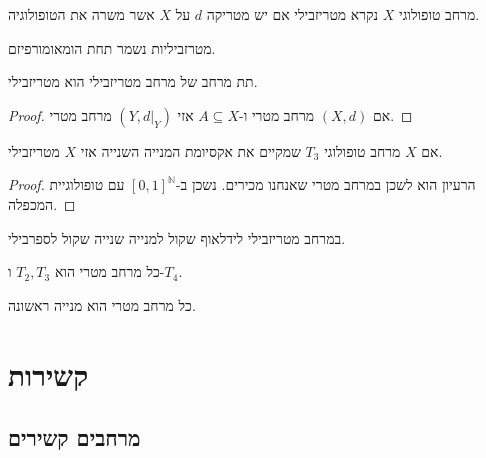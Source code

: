 \documentclass{tstextbook}
\begin{document}
\begin{definition}
מרחב טופולוגי \(X\) נקרא מטריזבילי אם יש מטריקה \(d\) על \(X\) אשר משרה את הטופולוגיה.

\end{definition}
\begin{proposition}
מטרזביליות נשמר תחת הומאומורפיזם.

\end{proposition}
\begin{proposition}
תת מרחב של מרחב מטריזבילי הוא מטריזבילי.

\end{proposition}
\begin{proof}
אם \((X,d)\) מרחב מטרי ו-\(A\subseteq X\) אזי \((Y,d|_{Y})\) מרחב מטרי.

\end{proof}
\begin{theorem}
אם \(X\) מרחב טופולוגי \(T_{3}\) שמקיים את אקסיומת המנייה השנייה אזי \(X\) מטריזבילי.

\end{theorem}
\begin{proof}
הרעיון הוא לשכן במרחב מטרי שאנחנו מכירים. נשכן ב-\([0,1]^{\mathbb{N}}\) עם טופולוגיית המכפלה.

\end{proof}
\begin{proposition}
במרחב מטריזבילי לידלאוף שקול למנייה שנייה שקול לספרבילי.

\end{proposition}
\begin{proposition}
כל מרחב מטרי הוא \(T_{2},T_{3}\) ו-\(T_{4}\).

\end{proposition}
\begin{proposition}
כל מרחב מטרי הוא מנייה ראשונה.

\end{proposition}
\chapter{קשירות}

\section{מרחבים קשירים}
\end{document}
